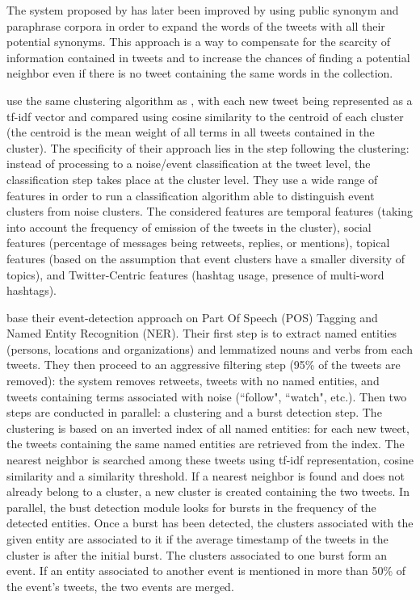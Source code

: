 The system proposed by \citet{petrovic_streaming_2010} has later been improved  \citep{petrovic_using_2012} by using public synonym and paraphrase corpora in order to expand the words of the tweets with all their potential synonyms. This approach is a way to compensate for the scarcity of information contained in tweets and to increase the chances of finding a potential neighbor even if there is no tweet containing the same words in the collection.

\citet{becker_beyond_2011} use the same clustering algorithm as \citet{sankaranarayanan_twitterstand:_2009}, with each new tweet being represented as a tf-idf vector and compared using cosine similarity to the centroid of each cluster (the centroid is the mean weight of all terms in all tweets contained in the cluster). The specificity of their approach lies in the step following the clustering: instead of processing to a noise/event classification at the tweet level, the classification step takes place at the cluster level. They use a wide range of features in order to run a classification algorithm able to distinguish event clusters from noise clusters. The considered features are temporal features (taking into account the frequency of emission of the tweets in the cluster), social features (percentage of messages being retweets, replies, or mentions), topical features (based on the assumption that event clusters have a smaller diversity of topics), and Twitter-Centric features (hashtag usage, presence of multi-word hashtags).

\citet{mcminn_real_2015} base their event-detection approach on Part Of Speech (POS) Tagging and Named Entity Recognition (NER). Their first step is to extract named entities (persons, locations and organizations) and lemmatized nouns and verbs from each tweets. They then proceed to an aggressive filtering step (95\% of the tweets are removed): the system removes retweets, tweets with no named entities, and tweets containing terms associated with noise (``follow", ``watch", etc.). Then two steps are conducted in parallel: a clustering and a burst detection step. The clustering is based on an inverted index of all named entities: for each new tweet, the tweets containing the same named entities are retrieved from the index. The nearest neighbor is searched among these tweets using tf-idf representation, cosine similarity and a similarity threshold. If a nearest neighbor is found and does not already belong to a cluster, a new cluster is created containing the two tweets. In parallel, the bust detection module looks for bursts in the frequency of the detected entities. Once a burst has been detected, the clusters associated with the given entity are associated to it if the average timestamp of the tweets in the cluster is after the initial burst. The clusters associated to one burst form an event. If an entity associated to another event is mentioned in more than 50\% of the event's tweets, the two events are merged.

